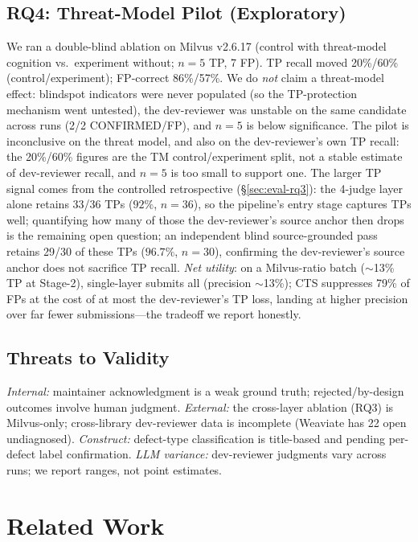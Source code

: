 \documentclass[sigconf, anonymous, review]{acmart}
\begin{document}
\subsection{RQ4: Threat-Model Pilot (Exploratory)}\label{sec:eval-tm}
We ran a double-blind ablation on Milvus v2.6.17 (control with threat-model cognition vs.\ experiment without; $n{=}5$ TP, 7 FP). TP recall moved 20\%/60\% (control/experiment); FP-correct 86\%/57\%. We do \emph{not} claim a threat-model effect: blindspot indicators were never populated (so the TP-protection mechanism went untested), the dev-reviewer was unstable on the same candidate across runs (2/2 CONFIRMED/FP), and $n{=}5$ is below significance. The pilot is inconclusive on the threat model, and also on the dev-reviewer's own TP recall: the 20\%/60\% figures are the TM control/experiment split, not a stable estimate of dev-reviewer recall, and $n{=}5$ is too small to support one. The larger TP signal comes from the controlled retrospective (\S\ref{sec:eval-rq3}): the 4-judge layer alone retains 33/36 TPs ($92\%$, $n{=}36$), so the pipeline's entry stage captures TPs well; quantifying how many of those the dev-reviewer's source anchor then drops is the remaining open question; an independent blind source-grounded pass retains 29/30 of these TPs ($96.7\%$, $n{=}30$), confirming the dev-reviewer's source anchor does not sacrifice TP recall. \emph{Net utility}: on a Milvus-ratio batch ($\sim$13\% TP at Stage-2), single-layer submits all (precision $\sim$13\%); CTS suppresses 79\% of FPs at the cost of at most the dev-reviewer's TP loss, landing at higher precision over far fewer submissions---the tradeoff we report honestly.

\subsection{Threats to Validity}
\emph{Internal:} maintainer acknowledgment is a weak ground truth; rejected/by-design outcomes involve human judgment. \emph{External:} the cross-layer ablation (RQ3) is Milvus-only; cross-library dev-reviewer data is incomplete (Weaviate has 22 open undiagnosed). \emph{Construct:} defect-type classification is title-based and pending per-defect label confirmation. \emph{LLM variance:} dev-reviewer judgments vary across runs; we report ranges, not point estimates.

\section{Related Work}\label{sec:rw}
\end{document}
